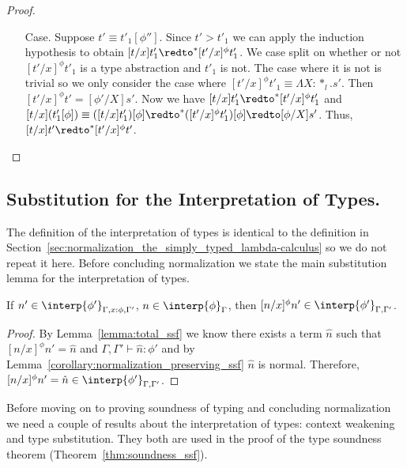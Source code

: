 \begin{proof}
\begin{itemize}
\item[Case.] Suppose $t' \equiv t'_1[\phi'']$.
  Since $t' > t'_1$ we can apply the induction hypothesis to
  obtain $[t/x] t'_1 \redto^* [t'/x]^\phi t'_1$.  We case split on whether or not $[t'/x]^\phi t'_1$ is
  a type abstraction and $t'_1$ is not.  The case where it is not is trivial so we only consider
  the case where $[t'/x]^\phi t'_1 \equiv \Lambda X:*_l.s'$.  Then 
  $[t'/x]^\phi t'  = [\phi'/X]s'$.  Now we have $[t/x] t'_1 \redto^* [t'/x]^\phi t'_1$ and
  $[t/x](t'_1[\phi]) \equiv ([t/x]t'_1)[\phi] \redto^* ([t'/x]^\phi t'_1)[\phi] \redto [\phi/X]s'$.  Thus,
  $[t/x]t' \redto^* [t'/x]^\phi t'$.  
\end{itemize}
\end{proof}

\subsection{Substitution for the Interpretation of Types.}
\label{subsec:substitution_for_the_interpretation_of_types_ssf}
The definition of the interpretation of types is identical to the
definition in
Section~\ref{sec:normalization_the_simply_typed_lambda-calculus}
so we do not repeat it here.  Before concluding normalization we state
the main substitution lemma for the interpretation of types.
\begin{lemma}
  If $n' \in \interp{\phi'}_{\Gamma,x:\phi,\Gamma'}$, $n \in \interp{\phi}_\Gamma$, then 
  $[n/x]^\phi n' \in \interp{\phi'}_{\Gamma,\Gamma'}$.
  
  \label{lemma:interpretation_of_types_closed_substitution_ssf}
\end{lemma}
\begin{proof}
  By Lemma~\ref{lemma:total_ssf} we know there exists a term $\hat{n}$ 
  such that $[n/x]^\phi n' = \hat{n}$ and $\Gamma,\Gamma' \vdash \hat{n}:\phi'$ and by 
  Lemma~\ref{corollary:normalization_preserving_ssf} $\hat{n}$ is normal.  Therefore,
  $[n/x]^\phi n' = \hat{n} \in \interp{\phi'}_{\Gamma,\Gamma'}$.
\end{proof}

Before moving on to proving soundness of typing and concluding
normalization we need a couple of results about the interpretation of
types: context weakening and type substitution.  They both are used in
the proof of the type soundness theorem
(Theorem~\ref{thm:soundness_ssf}).

